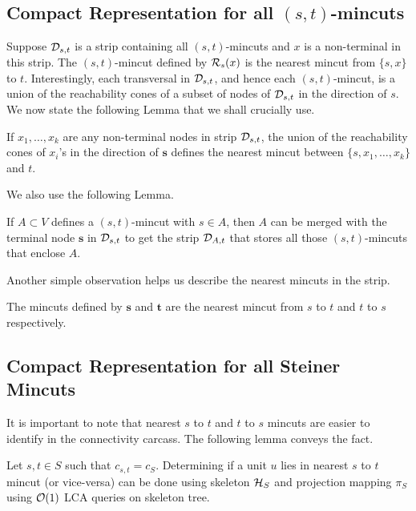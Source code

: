 \subsection*{Compact Representation for all $(s,t)$-mincuts}

Suppose ${\cal D}_{s,t}$ is a strip containing all $(s,t)$-mincuts and $x$ is a non-terminal in this strip. The $(s,t)$-mincut defined by ${\cal R}_s(x)$ is the nearest mincut from $\{s,x\}$ to $t$. Interestingly, each transversal in ${\cal D}_{s,t}$, and hence each $(s,t)$-mincut, is a union of the reachability cones of a subset of nodes of ${\cal D}_{s,t}$ in the direction of $s$. We now state the following Lemma that we shall crucially use.

\begin{lemma}
If $x_1,\ldots, x_k$ are any non-terminal nodes in strip ${\cal D}_{s,t}$,  the union of the reachability cones of $x_i$'s in the direction of ${\mathbf s}$ defines the nearest mincut between $\{s, x_1,\ldots, x_k\}$ and $t$.
\label{lem:reachability-cones}
\end{lemma} 

We also use the following Lemma.

\begin{lemma} 
If $A\subset V$ defines a $(s,t)$-mincut with $s\in A$, then $A$ can be merged with the terminal  node ${\mathbf s}$ in ${\cal D}_{s,t}$ to get the strip ${\cal D}_{A,t}$ that stores all those $(s,t)$-mincuts that enclose $A$.
\label{lem:strip-A}
\end{lemma}

Another simple observation helps us describe the nearest mincuts in the strip.

\begin{lemma}
The mincuts defined by $\mathbf{s}$ and $\mathbf{t}$ are the nearest mincut from $s$ to $t$ and $t$ to $s$ respectively.
\label{lem:nearest-mincut-strip}
\end{lemma}


\subsection*{Compact Representation for all Steiner Mincuts}
It is important to note that nearest $s$ to $t$ and $t$ to $s$ mincuts are easier to identify in the connectivity carcass. The following lemma conveys the fact.

\begin{lemma}
\label{lem:u-nearest-s-t-mincut}
Let $s,t \in S$ such that $c_{s,t}=c_S$. Determining if a unit $u$ lies in nearest $s$ to $t$ mincut (or vice-versa) can be done using skeleton ${\cal H}_S$ and projection mapping $\pi_S$ using ${\cal O}(1)$ LCA queries on skeleton tree.
\end{lemma}


